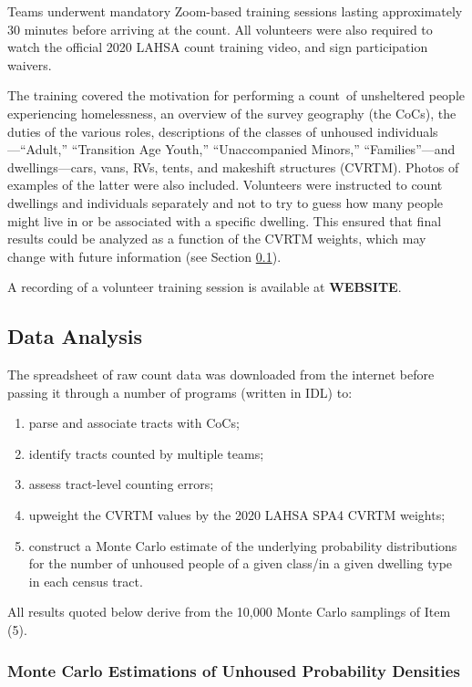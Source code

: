 \documentclass[11pt,twocolumn]{article}
\def\bfr{\bf\color{red}}
\def\Count{count}
\begin{document}
Teams underwent mandatory Zoom-based training sessions lasting approximately 30 minutes
before arriving at the count. All volunteers
were also required to watch the official 2020 LAHSA count training video, and sign participation waivers.

The training covered the motivation for performing a \Count\ of unsheltered people experiencing
homelessness, an overview of the survey geography (the CoCs), the duties of the various roles,
descriptions of the classes of unhoused individuals---``Adult,'' ``Transition Age Youth,'' 
``Unaccompanied Minors,'' ``Families''---and dwellings---cars, vans, RVs, tents, and makeshift structures
(CVRTM).
Photos of examples of the latter were also included. Volunteers were instructed to
count dwellings and individuals separately and not to try to guess how many people might live
in or be associated with a specific dwelling. This ensured that final results could be analyzed as a 
function of the CVRTM weights, which may change with future information (see Section 
\ref{sec:analysis}).

A recording of a volunteer training session is available at {\bfr WEBSITE}.

\subsection{Data Analysis}
\label{sec:analysis}

The spreadsheet of raw count data was downloaded from the internet before passing it through a number
of programs (written in IDL) to:
\begin{enumerate}
	\item parse and associate tracts with CoCs;
	\item identify tracts counted by multiple teams;
	\item assess tract-level counting errors;
	\item upweight the CVRTM values by the 2020 LAHSA SPA4 CVRTM weights;
	\item construct a Monte Carlo estimate of the underlying probability distributions
		for the number of unhoused people of a given class/in a given dwelling type
		in each census tract.
\end{enumerate}
All results quoted below derive from the 10,000 Monte Carlo samplings of Item (5).

\subsubsection{Monte Carlo Estimations of Unhoused Probability Densities}
\label{sec:mc}
\end{document}
